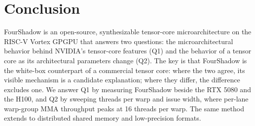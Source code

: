 
\section{Conclusion}

FourShadow is an open-source, synthesizable tensor-core microarchitecture on the RISC-V Vortex GPGPU that answers two questions: the microarchitectural behavior behind NVIDIA's tensor-core features (Q1) and the behavior of a tensor core as its architectural parameters change (Q2). The key is that FourShadow is the white-box counterpart of a commercial tensor core: where the two agree, its visible mechanism is a candidate explanation; where they differ, the difference excludes one. We answer Q1 by measuring FourShadow beside the RTX 5080 and the H100, and Q2 by sweeping threads per warp and issue width, where per-lane warp-group MMA throughput peaks at 16 threads per warp. The same method extends to distributed shared memory and low-precision formats.
